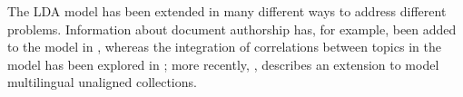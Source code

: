 
The LDA model \cite{blei_latent_2003} has been extended in many different ways to address different problems. Information about document authorship has, for example, been added to the model in \cite{Rosen_Zvi_2004}, whereas the integration of correlations between topics in the model has been explored in \cite{blei_correlated_2007}; more recently, \cite{Boyd_Graber_2009}, describes an extension to model multilingual unaligned collections.

